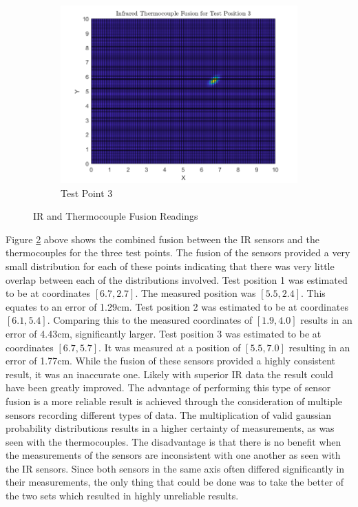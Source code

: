 \documentclass[12pt]{article}
\begin{document}
\begin{figure}[H]
\begin{subfigure}[h]{0.45\textwidth}
        \includegraphics[width=\textwidth]{images/IR_TempFusionA3.png}
        \caption{Test Point 3}
        \label{fig:Fus-3}
    \end{subfigure}
    \caption{IR and Thermocouple Fusion Readings}
    \label{fig:Fus}
\end{figure}
Figure \ref{fig:Fus} above shows the combined fusion between the IR sensors and the thermocouples for the three test points. The fusion of the sensors provided a very small distribution for each of these points indicating that there was very little overlap between each of the distributions involved. Test position 1 was estimated to be at coordinates $[6.7, 2.7]$. The measured position was $[5.5, 2.4]$. This equates to an error of 1.29cm. Test position 2 was estimated to be at coordinates $[6.1, 5.4]$. Comparing this to the measured coordinates of $[1.9, 4.0]$ results in an error of 4.43cm, significantly larger. Test position 3 was estimated to be at coordinates $[6.7, 5.7]$. It was measured at a position of $[5.5, 7.0]$ resulting in an error of 1.77cm. While the fusion of these sensors provided a highly consistent result, it was an inaccurate one. Likely with superior IR data the result could have been greatly improved. 
The advantage of performing this type of sensor fusion is a more reliable result is achieved through the consideration of multiple sensors recording different types of data. The multiplication of valid gaussian probability distributions results in a higher certainty of measurements, as was seen with the thermocouples. The disadvantage is that there is no benefit when the measurements of the sensors are inconsistent with one another as seen with the IR sensors. Since both sensors in the same axis often differed significantly in their measurements, the only thing that could be done was to take the better of the two sets which resulted in highly unreliable results. 
\end{document}
